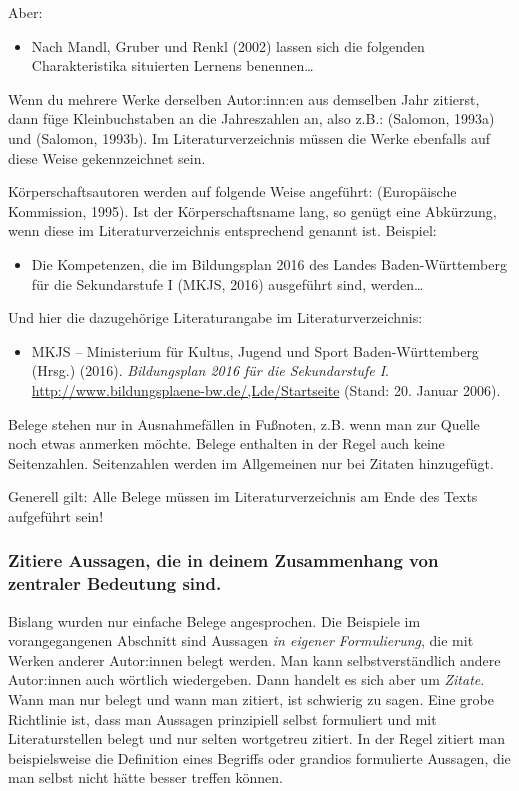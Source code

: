\documentclass{../cssheet}
\begin{document}
Aber:

\begin{itemize}
\item
  Nach Mandl, Gruber und Renkl (2002) lassen sich die folgenden
  Charakteristika situierten Lernens benennen\ldots{}
\end{itemize}

Wenn du mehrere Werke derselben Autor:inn:en aus demselben Jahr zitierst,
dann füge Kleinbuchstaben an die Jahreszahlen an, also z.B.: (Salomon,
1993a) und (Salomon, 1993b). Im Literaturverzeichnis müssen die Werke
ebenfalls auf diese Weise gekennzeichnet sein.

Kör\-per\-schafts\-au\-to\-ren werden auf folgende Weise angeführt: (Eu\-ro\-päi\-sche Kommission, 1995). Ist der Körperschaftsname lang, so genügt eine
Abkürzung, wenn diese im Literaturverzeichnis entsprechend genannt ist.
Beispiel:

\begin{itemize}
\item
  Die Kompetenzen, die im Bildungsplan 2016 des Landes Baden-Württemberg
  für die Sekundarstufe I (MKJS, 2016) ausgeführt sind, werden\ldots{}
\end{itemize}

Und hier die dazugehörige Literaturangabe im Literaturverzeichnis:

\begin{itemize}
\item
  MKJS -- Ministerium für Kultus, Jugend und Sport Baden-Württemberg (Hrsg.) (2016). \emph{Bildungsplan 2016 für die Sekundarstufe I}. \url{http://www.bildungsplaene-bw.de/,Lde/Startseite} (Stand: 20. Januar 2006).
\end{itemize}

Belege stehen nur in Ausnahmefällen in Fußnoten, z.B. wenn man zur
Quelle noch etwas anmerken möchte. Belege enthalten in der Regel auch
keine Seitenzahlen. Seitenzahlen werden im Allgemeinen nur bei Zitaten
hinzugefügt.

Generell gilt: Alle Belege müssen im Literaturverzeichnis am Ende des
Texts aufgeführt sein!

\subsubsection*{Zitiere Aussagen, die in deinem Zusammenhang von zentraler Bedeutung
sind.}

Bislang wurden nur einfache Belege angesprochen. Die Beispiele im
vorangegangenen Abschnitt sind Aussagen \emph{in eigener Formulierung},
die mit Werken anderer Autor:innen belegt werden. Man kann
selbstverständlich andere Autor:innen auch wörtlich wiedergeben. Dann
handelt es sich aber um \emph{Zitate}. Wann man nur belegt und wann man
zitiert, ist schwierig zu sagen. Eine grobe Richtlinie ist, dass man
Aussagen prinzipiell selbst formuliert und mit Literaturstellen belegt
und nur selten wortgetreu zitiert. In der Regel zitiert man
beispielsweise die Definition eines Begriffs oder grandios formulierte
Aussagen, die man selbst nicht hätte besser treffen können.
\end{document}
